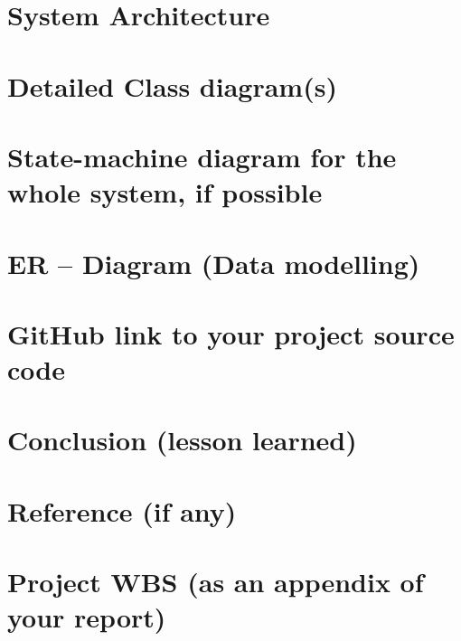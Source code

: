 \documentclass[11pt]{article}
\begin{document}
    \chapter{System Architecture}


    \chapter{Detailed Class diagram(s)}


    \chapter{State-machine diagram {for the whole system, if possible}}


    \chapter{ER – Diagram (Data modelling)}


    \chapter{GitHub link to your project source code}


    \chapter{Conclusion (lesson learned)}


    \chapter{Reference (if any)}


    \chapter{Project WBS (as an appendix of your report)}





    
    
\end{document}

